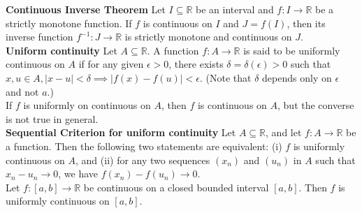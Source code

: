 \documentclass[10pt,landscape]{article}
\begin{document}
\begin{multicols}{3}
\textbf{Continuous Inverse Theorem} Let $I\subseteq\mathbb{R}$ be an interval and  $f:I\to\mathbb{R}$ be a strictly monotone function. If  $f$ is continuous on  $I$ and  $J=f(I)$, then its inverse function  $f^{-1}:J\to\mathbb{R}$ is strictly monotone and continuous on  $J$.\\
\textbf{Uniform continuity} Let  $A\subseteq\mathbb{R}$. A function  $f:A\to\mathbb{R}$ is said to be uniformly continuous on  $A$ if for any given  $\epsilon>0$, there exists  $\delta=\delta(\epsilon)>0$ such that  $x,u\in A, |x-u|<\delta\implies|f(x)-f(u)|<\epsilon$. (Note that $\delta$ depends only on  $\epsilon$ and not  $a$.) \\
If $f$ is uniformly on continuous on  $A$, then  $f$ is continuous on  $A$, but the converse is not true in general.\\
\textbf{Sequential Criterion for uniform continuity} Let  $A\subseteq\mathbb{R}$, and let  $f:A\to\mathbb{R}$ be a function. Then the following two statements are equivalent: (i)  $f$ is uniformly continuous on  $A$, and (ii) for any two sequences  $(x_n)$ and  $(u_n)$ in  $A$ such that  $x_n-u_n\to 0$, we have  $f(x_n)-f(u_n)\to 0$.\\
Let  $f:[a,b]\to\mathbb{R}$ be continuous on a closed bounded interval  $[a,b]$. Then  $f$ is uniformly continuous on  $[a,b]$.


\end{multicols}
\end{document}
